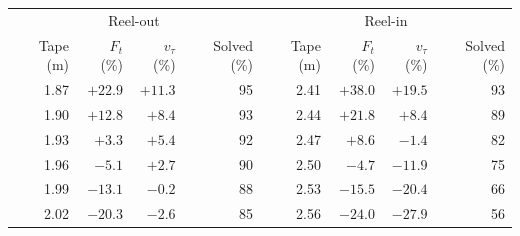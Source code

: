 \begin{tabular}{rrrrrrrr}
\toprule
\multicolumn{4}{c}{Reel-out} & \multicolumn{4}{c}{Reel-in} \\
Tape (m) & $F_t$ (\%) & $v_\tau$ (\%) & Solved (\%) & Tape (m) & $F_t$ (\%) & $v_\tau$ (\%) & Solved (\%) \\
\midrule
1.87 & $+22.9$ & $+11.3$ & 95 & 2.41 & $+38.0$ & $+19.5$ & 93 \\
1.90 & $+12.8$ & $+8.4$ & 93 & 2.44 & $+21.8$ & $+8.4$ & 89 \\
1.93 & $+3.3$ & $+5.4$ & 92 & 2.47 & $+8.6$ & $-1.4$ & 82 \\
1.96 & $-5.1$ & $+2.7$ & 90 & 2.50 & $-4.7$ & $-11.9$ & 75 \\
1.99 & $-13.1$ & $-0.2$ & 88 & 2.53 & $-15.5$ & $-20.4$ & 66 \\
2.02 & $-20.3$ & $-2.6$ & 85 & 2.56 & $-24.0$ & $-27.9$ & 56 \\
\bottomrule
\end{tabular}
